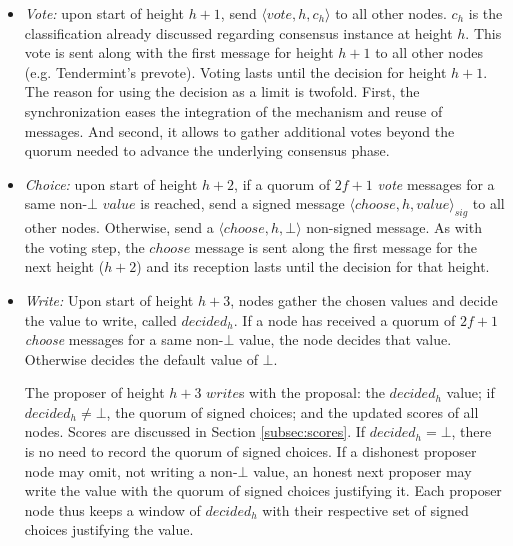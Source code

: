 \begin{itemize}
\item \textit{Vote:} upon start of height $h+1$, send $\langle vote,h,c_h \rangle$ to all other nodes.  $c_h$ is the classification already discussed regarding consensus instance at height $h$.   
%
%
This vote is sent along with the first message for height $h+1$ to all other nodes  (e.g. Tendermint's prevote).  
Voting lasts until the decision for height $h+1$.  
The reason for using the decision as a limit is twofold. First, the synchronization eases the integration of the mechanism and reuse of messages. %
And second, it allows to gather additional votes beyond the quorum needed to advance the underlying consensus phase.

\item \textit{Choice:} upon start of height $h+2$, if a quorum of $2f+1$ \textit{vote} messages for a same non-$\bot$ $value$ is reached,  send a signed message $\langle choose,h,value \rangle_{sig}$ to all other nodes.   Otherwise, send a $\langle choose,h,\bot \rangle$ non-signed message. 
As with the voting step, the $choose$ message is sent along the first message for the next height ($h+2$)
and its reception lasts until the decision for that height.    
%
%
 

\item \textit{Write:}  Upon start of height $h+3$, nodes gather the chosen values and decide the value to write, called $decided_h$.   
%
If a node has received a quorum of $2f+1$ 
\textit{choose} messages for a same non-$\bot$ value,
the node decides that value. 
Otherwise decides the default value of $\bot$.

The proposer of height $h+3$ $write$s with the proposal: the $decided_h$ value; if $decided_h \neq \bot$, the quorum of signed choices; and the updated scores of all nodes.  Scores are discussed in Section \ref{subsec:scores}.  If $decided_h = \bot$, there is no need to record the quorum of signed choices.  
If a dishonest proposer node may omit, not writing a non-$\bot$ value, an honest next proposer may write the value with the quorum of signed choices justifying it.
Each proposer node thus keeps a window of $decided_h$ with their respective set of signed choices justifying the value.


\end{itemize}
